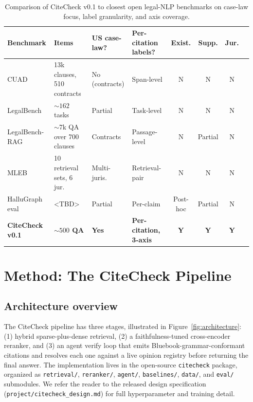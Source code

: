 \documentclass[11pt]{article}
\begin{document}
\begin{table}[t]
\centering
\small
\begin{tabular}{lp{2.3cm}p{1.6cm}p{2.2cm}cccc}
\toprule
\textbf{Benchmark} & \textbf{Items} & \textbf{US case-law?} &
\textbf{Per-citation labels?} & \textbf{Exist.} &
\textbf{Supp.} & \textbf{Jur.} \\
\midrule
CUAD              & 13k clauses, 510 contracts & No (contracts)
                  & Span-level     & N & N & N \\
LegalBench        & ${\sim}162$ tasks          & Partial
                  & Task-level     & N & N & N \\
LegalBench-RAG    & ${\sim}7$k QA over 700 clauses & Contracts
                  & Passage-level  & N & Partial & N \\
MLEB              & 10 retrieval sets, 6 jur.  & Multi-juris.
                  & Retrieval-pair & N & N & N \\
HalluGraph eval   & <TBD>                      & Partial
                  & Per-claim      & Post-hoc & Partial & N \\
\textbf{CiteCheck v0.1} & \textbf{${\sim}500$ QA} & \textbf{Yes}
                  & \textbf{Per-citation, 3-axis}
                  & \textbf{Y} & \textbf{Y} & \textbf{Y} \\
\bottomrule
\end{tabular}
\caption{Comparison of CiteCheck v0.1 to closest open legal-NLP
benchmarks on case-law focus, label granularity, and axis coverage.}
\label{tab:benchmark-comparison}
\end{table}

\section{Method: The CiteCheck Pipeline}
\label{sec:method}

\subsection{Architecture overview}
\label{sec:method:overview}

The CiteCheck pipeline has three stages, illustrated in
Figure~\ref{fig:architecture}: (1) hybrid sparse-plus-dense retrieval,
(2) a faithfulness-tuned cross-encoder reranker, and (3) an agent
verify loop that emits Bluebook-grammar-conformant citations and
resolves each one against a live opinion registry before returning the
final answer. The implementation lives in the open-source
\texttt{citecheck} package, organized as
\texttt{retrieval/}, \texttt{reranker/}, \texttt{agent/},
\texttt{baselines/}, \texttt{data/}, and \texttt{eval/} submodules.
We refer the reader to the released design specification
(\texttt{project/citecheck\_design.md}) for full hyperparameter and
training detail.
\end{document}

